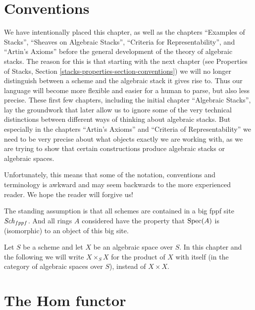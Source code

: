 \section{Conventions}
\label{section-conventions}

\noindent
We have intentionally placed this chapter, as well as the chapters
``Examples of Stacks'', ``Sheaves on Algebraic Stacks'',
``Criteria for Representability'', and ``Artin's Axioms'' before the
general development of the theory of algebraic stacks. The reason
for this is that starting with the next chapter (see
Properties of Stacks, Section \ref{stacks-properties-section-conventions})
we will no longer distinguish between a scheme and the algebraic stack
it gives rise to. Thus our language will become more flexible and
easier for a human to parse, but also less precise. These first few
chapters, including the initial chapter ``Algebraic Stacks'', lay the
groundwork that later allow us to ignore some of the very technical
distinctions between different ways of thinking about algebraic stacks.
But especially in the chapters ``Artin's Axioms'' and
``Criteria of Representability'' we need
to be very precise about what objects exactly we are working with, as
we are trying to show that certain constructions produce algebraic stacks or
algebraic spaces.

\medskip\noindent
Unfortunately, this means that some of the notation, conventions and
terminology is awkward and may seem backwards to the more experienced
reader. We hope the reader will forgive us!

\medskip\noindent
The standing assumption is that all schemes are contained in
a big fppf site $\mathit{Sch}_{fppf}$. And all rings $A$ considered
have the property that $\mathop{\mathrm{Spec}}(A)$ is (isomorphic) to an
object of this big site.

\medskip\noindent
Let $S$ be a scheme and let $X$ be an algebraic space over $S$.
In this chapter and the following we will write $X \times_S X$
for the product of $X$ with itself (in the category of algebraic
spaces over $S$), instead of $X \times X$.















\section{The Hom functor}
\label{section-hom}

